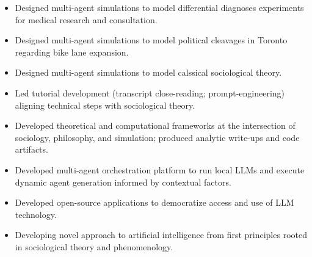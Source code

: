 \begin{itemize}
  \item Designed multi-agent simulations to model differential diagnoses experiments for medical research and consultation.
  \item Designed multi-agent simulations to model political cleavages in Toronto regarding bike lane expansion.
  \item Designed multi-agent simulations to model calssical sociological theory.
  \item Led tutorial development (transcript close-reading; prompt-engineering) aligning technical steps with sociological theory.
\end{itemize}

\begin{itemize}
  \item Developed theoretical and computational frameworks at the intersection of sociology, philosophy, and simulation; produced analytic write-ups and code artifacts.
\end{itemize}

\begin{itemize}
  \item Developed multi-agent orchestration platform to run local LLMs and execute dynamic agent generation informed by contextual factors.
  \item Developed open-source applications to democratize access and use of LLM technology.
  \item Developing novel approach to artificial intelligence from first principles rooted in sociological theory and phenomenology.
\end{itemize}
